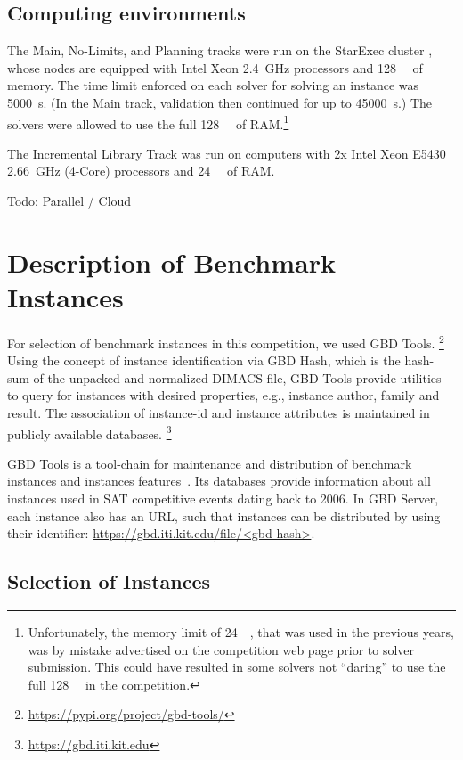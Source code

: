 \documentclass{elsarticle}
\newcommand{\todo}[1]{{\color{purple}Todo: #1}}
\begin{document}
\subsection{Computing environments}

\label{sec:computing}
The Main, No-Limits, and Planning tracks were run on the StarExec cluster \cite{starexec},
whose nodes are equipped with Intel Xeon \SI{2.4}{\giga\hertz} processors 
and \SI{128}{\giga\byte} of memory.
The time limit enforced on each solver for solving an instance was \SI{5000}{\second}. 
(In the Main track, validation then continued for up to \SI{45000}{\second}.)
The solvers were allowed to use the full \SI{128}{\giga\byte} of RAM.\footnote{
Unfortunately, the memory limit of \SI{24}{\giga\byte}, that was used in the previous years,
was by mistake advertised on the competition web page prior to solver submission.
This could have resulted in some solvers not ``daring'' to use the full \SI{128}{\giga\byte}
in the competition.}

The Incremental Library Track was run on computers with 2x Intel Xeon E5430 \SI{2.66}{\giga\hertz}
(4-Core) processors and \SI{24}{\giga\byte} of RAM.

\todo{Parallel / Cloud}

\section{Description of Benchmark Instances}
\label{sec:instances}

For selection of benchmark instances in this competition, we used GBD Tools.%
\footnote{\url{https://pypi.org/project/gbd-tools/}} 
Using the concept of instance identification via GBD Hash, which is the hash-sum of the unpacked and normalized DIMACS file, GBD Tools provide utilities to query for instances with desired properties, e.g., instance author, family and result.
The association of instance-id and instance attributes is maintained in publicly available databases.%
\footnote{\url{https://gbd.iti.kit.edu}}

GBD Tools is a tool-chain for maintenance and distribution of benchmark instances and instances features~\cite{Iser:2018:GBD}. 
Its databases provide information about all instances used in SAT competitive events dating back to 2006. 
In GBD Server, each instance also has an URL, such that instances can be distributed by using their identifier: \url{https://gbd.iti.kit.edu/file/<gbd-hash>}.


\subsection{Selection of Instances}
\label{sec:byob}
\end{document}
